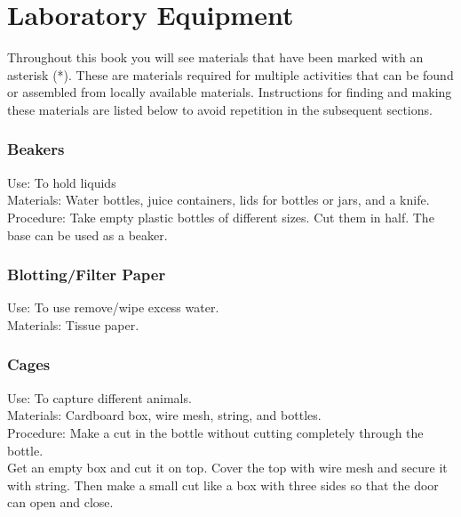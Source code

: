 \chapter{Laboratory Equipment}
Throughout this book you will see materials that have been marked with an asterisk (*). These are materials required for multiple activities that can be found or assembled from locally available materials. Instructions for finding and making these materials are listed below to avoid repetition in the subsequent sections.


\subsection*{Beakers}


Use: To hold liquids\\
Materials: Water bottles, juice containers, lids for bottles or jars, and a knife.\\
Procedure: Take empty plastic bottles of different sizes. Cut them in half. The base can be used as a beaker.\\

%

\subsection*{Blotting/Filter Paper}


Use: To use remove/wipe excess water.\\
Materials: Tissue paper. \\


\subsection*{Cages}


Use: To capture different animals.\\
Materials: Cardboard box, wire mesh, string, and bottles.\\
Procedure: Make a cut in the bottle without cutting completely through the bottle.\\Get an empty box and cut it on top. Cover the top with wire mesh and secure it with string. Then make a small cut like a box with three sides so that the door can open and close.  

